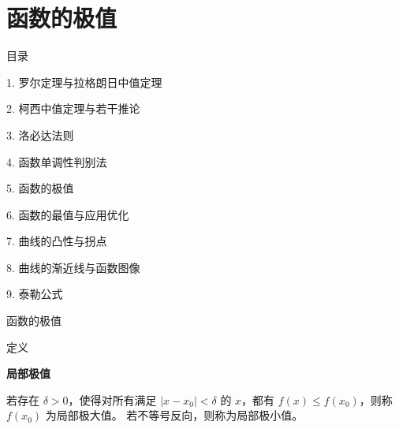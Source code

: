 \documentclass[aspectratio=169,10pt,fontset=fandol]{ctexbeamer}
\begin{document}
\section{函数的极值}
\begin{frame}[t,fragile]{目录}
\normalsize
{\color{black}\normalsize 1. 罗尔定理与拉格朗日中值定理\par}\vspace{0.22em}
{\color{black}\normalsize 2. 柯西中值定理与若干推论\par}\vspace{0.22em}
{\color{black}\normalsize 3. 洛必达法则\par}\vspace{0.22em}
{\color{black}\normalsize 4. 函数单调性判别法\par}\vspace{0.22em}
{\color{blue}\normalsize 5. 函数的极值\par}\vspace{0.22em}
{\color{gray!40}\normalsize 6. 函数的最值与应用优化\par}\vspace{0.22em}
{\color{gray!40}\normalsize 7. 曲线的凸性与拐点\par}\vspace{0.22em}
{\color{gray!40}\normalsize 8. 曲线的渐近线与函数图像\par}\vspace{0.22em}
{\color{gray!40}\normalsize 9. 泰勒公式\par}\vspace{0.22em}
\end{frame}
\begin{frame}[t,fragile]{函数的极值}
\normalsize
\begin{block}{定义}
{\normalsize
\textbf{局部极值}\par

若存在 $\delta>0$，使得对所有满足 $|x-x_0|<\delta$ 的 $x$，都有 $f(x)\leq f(x_0)$，则称 $f(x_0)$ 为局部极大值。 若不等号反向，则称为局部极小值。

}
\end{block}
\end{frame}
\end{document}
